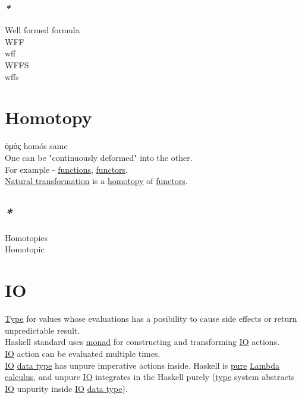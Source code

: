 \documentclass[a4paper,14pt,oneside]{book}
\begin{document}
\subsection{\emph{*}}
\label{sec:orga3923b1}
\label{org88ada2f}Well formed formula\\
\label{org0b030ee}WFF\\
\label{orga6a84bf}wff\\
\label{org604d66e}WFFS\\
\label{org35a4dbf}wffs\\

\chapter{\label{orgf84393a}Homotopy}
\label{sec:org0402579}
ὁμός homós same\\

One can be "continuously deformed" into the other.\\

For example - \hyperref[orgcfd72f2]{functions}, \hyperref[org7eee6bb]{functors}.\\
\hyperref[org4af0ef8]{Natural transformation} is a \hyperref[orgf84393a]{homotopy} of \hyperref[org7eee6bb]{functors}.\\

\section{\emph{*}}
\label{sec:org8e43a09}

\label{orgdba1699}Homotopies\\
\label{org2a34d68}Homotopic\\

\chapter{\label{org786f026}IO}
\label{sec:org6f826ee}
\hyperref[orgdbcea73]{Type} for values whose evaluations has a posibility to cause side effects or return unpredictable result.\\
Haskell standard uses \hyperref[org075259d]{monad} for constructing and transforming \hyperref[org786f026]{IO} actions.\\
\hyperref[org786f026]{IO} action can be evaluated multiple times.\\

\hyperref[org786f026]{IO} \hyperref[org1d671b5]{data type} has unpure imperative actions inside. Haskell is \hyperref[org1a9f39a]{pure} \hyperref[org64d7489]{Lambda calculus}, and unpure \hyperref[org786f026]{IO} integrates in the Haskell purely (\hyperref[orgdbcea73]{type} system abstracts \hyperref[org786f026]{IO} unpurity inside \hyperref[org786f026]{IO} \hyperref[org1d671b5]{data type}).\\
\end{document}
